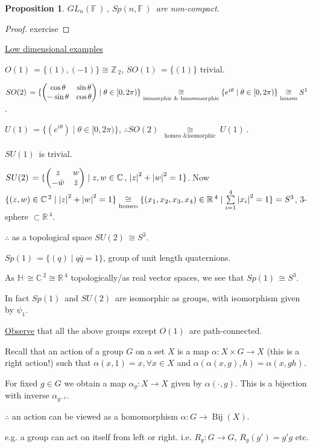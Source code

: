 \documentclass[12pt,a4paper]{article}
\newcommand{\zZ}{\ensuremath{\mathbb{Z}\,}}
\newcommand{\rR}{\ensuremath{\mathbb{R}\,}}
\newcommand{\cC}{\ensuremath{\mathbb{C}\,}}
\newcommand{\hH}{\ensuremath{\mathbb{H}\,}}
\newcommand{\fF}{\ensuremath{\mathbb{F}\,}}
\newcommand{\glnff}{\ensuremath{GL_n(\fF)\,}}
\newcommand{\gok}[1]{\ensuremath{O(#1)\,}}
\newcommand{\guk}[1]{\ensuremath{U(#1)\,}}
\newcommand{\gspk}[1]{\ensuremath{Sp(#1)\,}}
\newcommand{\gsok}[1]{\ensuremath{SO(#1)\,}}
\newcommand{\gsuk}[1]{\ensuremath{SU(#1)\,}}
\newcommand{\ul}[1]{\underline{#1}}
\newcommand{\bij}[1]{\ensuremath{\operatorname{Bij}(#1)}}
\newtheorem{prop}[thm]{Proposition}
\begin{document}
\begin{prop}
\glnff, \gspk{n,\fF} are non-compact.
\end{prop}

\begin{proof}
exercise
\end{proof}

\underline{Low dimensional examples}

$\gok{1}=\{(1),(-1)\}\cong \zZ_2$, $\gsok{1}=\{(1)\}$ trivial.

$\gsok{2}=\{\pmqty{\cos\theta & \sin\theta \\ -\sin\theta & \cos\theta} \mid \theta \in [0,2\pi )\}\underset{\text{isomorphic \& homeomorphic}}{\cong} \{e^{i\theta}\mid \theta \in [0,2\pi )\}\underset{\text{homeo}}{\cong} S^1$.

$\guk{1}=\{(e^{i\theta})\mid \theta \in [0,2\pi )\}$, $\therefore \gsok{2}\underset{\text{ homeo \& isomorphic }}{\cong}\guk{1}$.

$\gsuk{1}$ is trivial.

$\gsuk{2}=\{\pmqty{z & w \\ -\bar{w} & \bar{z}} \mid z,w \in \cC, \, \abs{z}^2+\abs{w}^2=1\}$. Now $\{(z,w) \in \cC^2 \mid \abs{z}^2+\abs{w}^2=1\}\underset{\text{homeo}}{\cong}  \{(x_1,x_2,x_3,x_4) \in \rR^4 \mid \sum\limits_{i=1}^4\abs{x_i}^2=1\}=S^3$, 3-sphere $\subset \rR^4$.

$\therefore$ as a topological space $\gsuk{2}\cong S^3$.

$\gspk{1}=\{(q)\mid q\bar{q}=1\}$, group of unit length quaternions.

As $\hH\cong \cC^2\cong \rR^4$ topologically/as real vector spaces, we see that $\gspk{1}\cong S^3$.

In fact \gspk{1} and \gsuk{2} are isomorphic as groups, with isomorphism given by $\psi_1$.

\ul{Observe} that all the above groups except \gok{1} are path-connected.

Recall that an action of a group $G$ on a set $X$ is a map $\alpha:X\times G\to X$ (this is a right action!) such that $\alpha(x,1)=x, \forall x\in X$ and $\alpha(\alpha(x,g),h)=\alpha(x,gh)$. 

For fixed $g\in G$ we obtain a map $\alpha_g :X\to X$ given by $\alpha(\cdot,g)$. This is a bijection with inverse $\alpha_{g^{-1}}$. 

$\therefore$ an action can be viewed as a homomorphism $\alpha: G\to \bij{X}$.  

e.g. a group can act on itself from left or right. i.e. $R_g:G\to G$, $R_g(g')=g'g$ etc.
\end{document}
